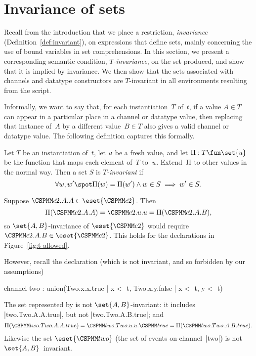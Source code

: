 \section{Invariance of sets}
\label{sec:invariance}

Recall from the introduction that we place a restriction, \emph{invariance}
(Definition~\ref{def:invariant}), on expressions that define sets, mainly
concerning the use of bound variables in set comprehensions.  In this section,
we present a corresponding semantic condition, \emph{$T$-invariance}, on the
set produced, and show that it is implied by invariance.  We then show that
the sets associated with channels and datatype constructors are
$T$-invariant in all environments resulting from the script. 

Informally, we want to say that, for each instantiation~$T$ of~$t$, if a value
$A \in T$ can appear in a particular place in a channel or datatype value,
then replacing that instance of~$A$ by a different value~$B \in T$ also gives
a valid channel or datatype value.  
The following definition captures this formally.
%
\begin{definition}
Let $T$ be an instantiation of~$t$, let $u$ be a fresh value, and let
$\unitf : T \fun \set{\unit}$ be the function that maps each element of~$T$
to~$u$. Extend~$\Pi$ to other values in the normal way.  Then a set $S$
is \emph{$T$-invariant} if
\[
\forall w, w' \spot
  \unitf(w) = \unitf(w') \land w \in S  \implies w' \in S.
\]
\end{definition}


\begin{example}
Suppose $\M{c2}.A.A \in \eset{\M{c2}}$.  Then 
\[
\unitf(\M{c2}.A.A) = \M{c2}.\unit.\unit = \unitf(\M{c2}.A.B),
\]
so $\set{A,B}$-invariance of $\eset{\M{c2}}$ would require $\M{c2}.A.B \in
\eset{\M{c2}}$.  This holds for the declarations in
Figure~\ref{fig:t-allowed}.

However, recall the declaration (which is not invariant, and so forbidden by
our assumptions)
%
\begin{cspm}
channel two : union({Two.x.x.true | x <- t}, {Two.x.y.false | x <- t, y <- t})
\end{cspm}
%
The set represented by  is not
$\set{A,B}$-invariant: it includes |two.Two.A.A.true|, but not
|two.Two.A.B.true|; and
\[
\unitf(\M{two.Two.A.A.true}) = \M{two.Two}.u.u.\M{true} =
   \unitf(\M{two.Two.A.B.true}).
\]
Likewise the set $\eset{\M{two}}$ (the set of events on channel~|two|) is not
$\set{A,B}$~invariant. 
\end{example}

